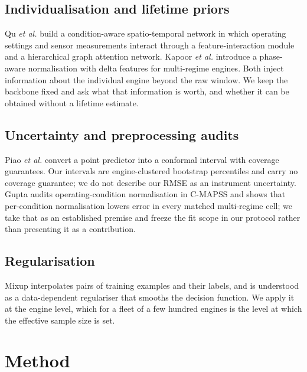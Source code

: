 \documentclass[journal]{IEEEtran}
\begin{document}
\subsection{Individualisation and lifetime priors}
Qu \emph{et al.} \cite{qu2026} build a condition-aware spatio-temporal network in which operating settings and sensor measurements interact through a feature-interaction module and a hierarchical graph attention network. Kapoor \emph{et al.} \cite{kapoor2026} introduce a phase-aware normalisation with delta features for multi-regime engines. Both inject information about the individual engine beyond the raw window. We keep the backbone fixed and ask what that information is worth, and whether it can be obtained without a lifetime estimate.

\subsection{Uncertainty and preprocessing audits}
Piao \emph{et al.} \cite{piao2025} convert a point predictor into a conformal interval with coverage guarantees. Our intervals are engine-clustered bootstrap percentiles and carry no coverage guarantee; we do not describe our RMSE as an instrument uncertainty. Gupta \cite{gupta2026} audits operating-condition normalisation in C-MAPSS and shows that per-condition normalisation lowers error in every matched multi-regime cell; we take that as an established premise and freeze the fit scope in our protocol rather than presenting it as a contribution.

\subsection{Regularisation}
Mixup \cite{zhang2018} interpolates pairs of training examples and their labels, and is understood as a data-dependent regulariser that smooths the decision function. We apply it at the engine level, which for a fleet of a few hundred engines is the level at which the effective sample size is set.

\section{Method}\label{sec:method}
\end{document}
